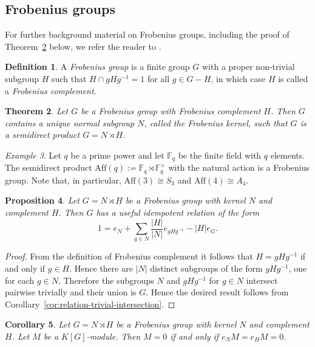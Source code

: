 \documentclass[12pt]{amsart}
\theoremstyle{plain}
\newtheorem{theorem}{Theorem}[section]
\newtheorem{corollary}[theorem]{Corollary}
\newtheorem{prop}[theorem]{Proposition}
\theoremstyle{remark}
\newtheorem{example}[theorem]{Example}
\theoremstyle{definition}
\newtheorem{definition}[theorem]{Definition}
\newcommand{\F}{\mathbb{F}}
\newcommand{\Aff}{\mathrm{Aff}}
\numberwithin{equation}{section}
\begin{document}
\subsection{Frobenius groups}\label{sub:frobeniusgroups}
For further background material on Frobenius groups, including the proof of Theorem~\ref{thm:Frobenius} below, we refer the reader to \cite[\S 14A]{MR632548}.

\begin{definition}
A \emph{Frobenius group} is a finite group $G$ with a proper non-trivial subgroup $H$ such that 
$H \cap {gHg^{-1}} = 1$ for all $g \in G - H$, in which case $H$ is called a \emph{Frobenius complement}.
\end{definition}

\begin{theorem}\label{thm:Frobenius}
Let $G$ be a Frobenius group with Frobenius complement $H$.
Then $G$ contains a unique normal subgroup $N$, called the \emph{Frobenius kernel}, 
such that $G$ is a semidirect product $G= N \rtimes H$.
\end{theorem}

\begin{example}\label{exa:affinefrobenius}
Let $q$ be a prime power and let $\F_{q}$ be the finite field with $q$ elements.
The semidirect product $\Aff(q) := \F_{q} \rtimes \F_{q}^{\times}$ with the natural action
is a Frobenius group.
Note that, in particular, $\Aff(3) \cong S_{3}$ and $\Aff(4) \cong A_{4}$. 
\end{example}

\begin{prop}\label{prop:Frob-idem-relation}
Let $G = N \rtimes H$ be a Frobenius group with kernel $N$ and complement $H$.
Then $G$ has a useful idempotent relation of the form
\[
1 = e_{N} + \sum_{g \in N} \frac{|H|}{|N|}e_{gHg^{-1}} - |H| e_{G}. 
\] 
\end{prop}

\begin{proof}
From the definition of Frobenius complement it follows that $H=gHg^{-1}$ if and only if $g \in H$.
Hence there are $|N|$ distinct subgroups of the form $gHg^{-1}$, one for each $g \in N$.
Therefore the subgroups $N$ and $gHg^{-1}$ for $g \in N$ intersect pairwise trivially 
and their union is $G$. 
Hence the desired result follows from Corollary~\ref{cor:relation-trivial-intersection}.
\end{proof}

\begin{corollary}\label{cor:Frob-idem-relation}
Let $G = N \rtimes H$ be a Frobenius group with kernel $N$ and complement $H$.
Let $M$ be a $K[G]$-module. Then $M=0$ if and only if $e_{N}M=e_{H}M=0$.
\end{corollary}
\end{document}

